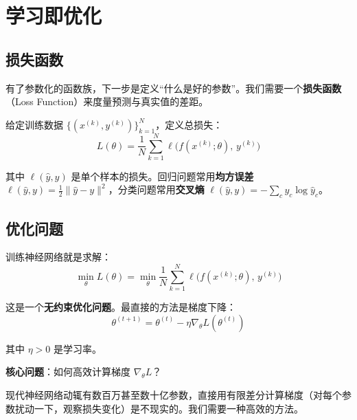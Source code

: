 
\section{学习即优化}

\subsection{损失函数}

有了参数化的函数族，下一步是定义``什么是好的参数''。我们需要一个\textbf{损失函数}（Loss Function）来度量预测与真实值的差距。

给定训练数据 $\{(x^{(k)}, y^{(k)})\}_{k=1}^N$，定义总损失：
\begin{equation}
L(\theta) = \frac{1}{N} \sum_{k=1}^N \ell\big(f(x^{(k)}; \theta), \, y^{(k)}\big)
\end{equation}

其中 $\ell(\hat{y}, y)$ 是单个样本的损失。回归问题常用\textbf{均方误差} $\ell(\hat{y}, y) = \frac{1}{2}\|\hat{y} - y\|^2$，分类问题常用\textbf{交叉熵} $\ell(\hat{y}, y) = -\sum_c y_c \log \hat{y}_c$。

\subsection{优化问题}

训练神经网络就是求解：
\begin{equation}
\min_\theta L(\theta) = \min_\theta \frac{1}{N} \sum_{k=1}^N \ell\big(f(x^{(k)}; \theta), \, y^{(k)}\big)
\end{equation}

这是一个\textbf{无约束优化问题}。最直接的方法是梯度下降：
\begin{equation}
\theta^{(t+1)} = \theta^{(t)} - \eta \nabla_\theta L(\theta^{(t)})
\end{equation}

其中 $\eta > 0$ 是学习率。

\textbf{核心问题}：如何高效计算梯度 $\nabla_\theta L$？

现代神经网络动辄有数百万甚至数十亿参数，直接用有限差分计算梯度（对每个参数扰动一下，观察损失变化）是不现实的。我们需要一种高效的方法。

